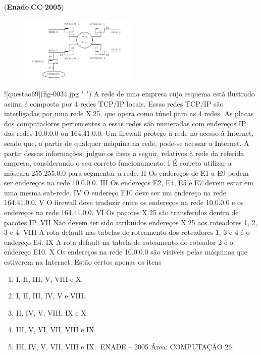 \documentclass{exam}
\begin{document}
\begin{questions}
\question (\textbf{Enade}$|$\textbf{CC}-\textbf{2005}) \begin{figure}[H]
	\begin{center}
		\includegraphics[width=0.5\textwidth]{CIENCIA_DA_COMPUTACAO_Prova2005-utf8_figuras/fig-0034.jpg}
		\caption{ }
	\end{center}
\end{figure}
![questao69](fig-0034.jpg " ")
A rede de uma empresa cujo esquema está ilustrado
acima é composta por 4 redes TCP/IP locais. Essas redes
TCP/IP são interligadas por uma rede X.25, que opera
como túnel para as 4 redes. As placas dos computadores
pertencentes a essas redes são numeradas com endereços IP
das redes 10.0.0.0 ou 164.41.0.0. Um firewall protege a
rede no acesso à Internet, sendo que, a partir de qualquer
máquina na rede, pode-se acessar a Internet.
A partir dessas informações, julgue os itens a seguir, relativos à
rede da referida empresa, considerando o seu correto
funcionamento.
I É correto utilizar a máscara 255.255.0.0 para segmentar a
rede.
II Os endereços de E1 a E9 podem ser endereços na rede
10.0.0.0.
III Os endereços E2, E4, E5 e E7 devem estar em uma mesma
sub-rede.
IV O endereço E10 deve ser um endereço na rede 164.41.0.0.
V O firewall deve traduzir entre os endereços na rede 10.0.0.0
e os endereços na rede 164.41.0.0.
VI Os pacotes X.25 são transferidos dentro de pacotes IP.
VII Não devem ter sido atribuídos endereços X.25 aos
roteadores 1, 2, 3 e 4.
VIII A rota default nas tabelas de roteamento dos roteadores
1, 3 e 4 é o endereço E4.
IX A rota default na tabela de roteamento do roteador 2 é o
endereço E10.
X Os endereços na rede 10.0.0.0 são visíveis pelas máquinas
que estiverem na Internet.
Estão certos apenas os itens
	\begin{enumerate}[label=\alph*)]
		\item  I, II, III, V, VIII e X.
		\item  I, II, III, IV, V e VIII.
		\item  II, IV, V, VIII, IX e X.
		\item  III, V, VI, VII, VIII e IX.
		\item  III, IV, V, VII, VIII e IX.
ENADE – 2005 Área: COMPUTAÇÃO 26


\end{enumerate}
\end{questions}
\end{document}
